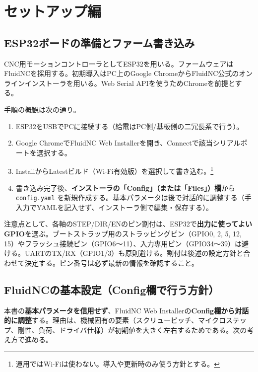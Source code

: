 \documentclass[uplatex,dvipdfmx]{ujarticle}
\begin{document}
\section{セットアップ編}

\subsection{ESP32ボードの準備とファーム書き込み}

CNC用モーションコントローラとしてESP32を用いる。ファームウェアはFluidNCを採用する。初期導入はPC上のGoogle ChromeからFluidNC公式のオンラインインストーラを用いる。Web Serial APIを使うためChromeを前提とする。

手順の概観は次の通り。
\begin{enumerate}
\item ESP32をUSBでPCに接続する（給電はPC側/基板側の二冗長系で行う）。
\item Google ChromeでFluidNC Web Installerを開き、Connectで該当シリアルポートを選択する。
\item InstallからLatestビルド（Wi-Fi有効版）を選択して書き込む。\footnote{運用ではWi-Fiは使わない。導入や更新時のみ使う方針とする。}
\item 書き込み完了後、\textbf{インストーラの「Config」（または「Files」）欄}から \texttt{config.yaml} を新規作成する。基本パラメータは後で対話的に調整する（手入力でYAMLを記入せず、インストーラ側で編集・保存する）。
\end{enumerate}

注意点として、各軸のSTEP/DIR/ENのピン割付は、ESP32で\textbf{出力に使ってよいGPIO}を選ぶ。ブートストラップ用のストラッピングピン（GPIO0, 2, 5, 12, 15）やフラッシュ接続ピン（GPIO6〜11）、入力専用ピン（GPIO34〜39）は避ける。UARTのTX/RX（GPIO1/3）も原則避ける。割付は後述の設定方針と合わせて決定する。ピン番号は必ず最新の情報を確認すること｡


\newpage

\subsection{FluidNCの基本設定（Config欄で行う方針）}

本書の\textbf{基本パラメータを信用せず}、FluidNC Web Installerの\textbf{Config欄から対話的に調整}する。理由は、機械固有の要素（スクリューピッチ、マイクロステップ、剛性、負荷、ドライバ仕様）が初期値を大きく左右するためである。次の考え方で進める。
\end{document}
